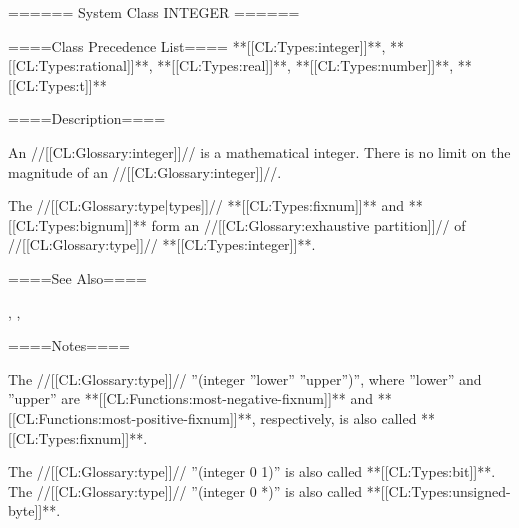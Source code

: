 ====== System Class INTEGER ======

====Class Precedence List==== **[[CL:Types:integer]]**, **[[CL:Types:rational]]**, **[[CL:Types:real]]**, **[[CL:Types:number]]**, **[[CL:Types:t]]**

====Description====

An //[[CL:Glossary:integer]]// is a mathematical integer. There is no limit on the magnitude of an //[[CL:Glossary:integer]]//.

The //[[CL:Glossary:type|types]]// **[[CL:Types:fixnum]]** and **[[CL:Types:bignum]]** form an //[[CL:Glossary:exhaustive partition]]// of //[[CL:Glossary:type]]// **[[CL:Types:integer]]**.


====See Also====

{\figref\SyntaxForNumericTokens}, {\secref\NumsFromTokens}, {\secref\PrintingIntegers}

====Notes====

The //[[CL:Glossary:type]]// ''(integer ''lower'' ''upper'')'', where ''lower'' and ''upper'' are **[[CL:Functions:most-negative-fixnum]]** and **[[CL:Functions:most-positive-fixnum]]**, respectively, is also called **[[CL:Types:fixnum]]**.

The //[[CL:Glossary:type]]// ''(integer 0 1)'' is also called **[[CL:Types:bit]]**. The //[[CL:Glossary:type]]// ''(integer 0 *)'' is also called **[[CL:Types:unsigned-byte]]**.

 
